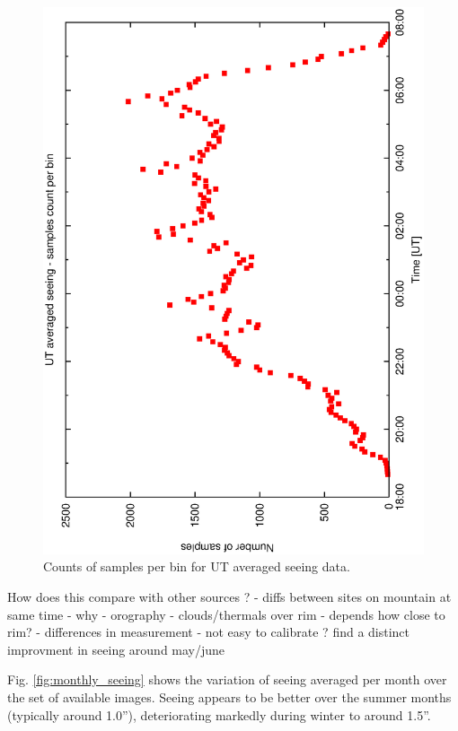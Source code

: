 {{\begin{figure}[htbp]
\begin{center}
    \includegraphics[scale=0.4, angle=-90]{figures/ecs/ut_bin_counts.eps}
\end{center} 
\caption[Counts of samples per bin for UT averaged seeing data.]
{Counts of samples per bin for UT averaged seeing data.}
\label{fig:ut_bin_count}
\end{figure}


How does this compare with other sources ? - diffs between sites on mountain at same time - why - orography - clouds/thermals over rim - depends how close to rim? - differences in measurement - not easy to calibrate ? \cite{munoz97nighttime} find a distinct improvment in seeing around may/june

Fig. \ref{fig:monthly_seeing} shows the variation of seeing averaged per month over the set of available images. Seeing appears to be better over the summer months (typically around 1.0''), deteriorating markedly during winter to around 1.5''. 

}}
